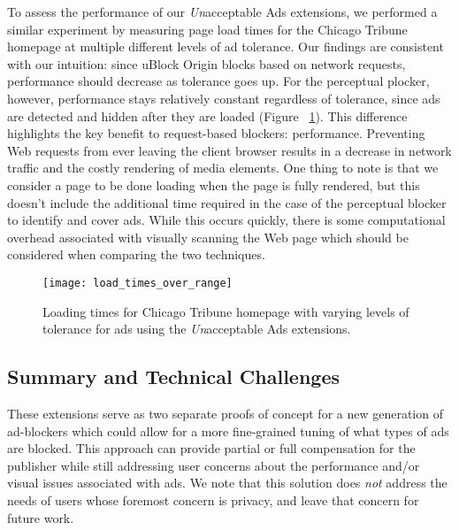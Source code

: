 To assess the performance of our \textit{Un}acceptable Ads extensions, we performed a similar experiment by measuring page load times for the Chicago Tribune homepage at multiple different levels of ad tolerance.
Our findings are consistent with our intuition: since uBlock Origin blocks based on network requests, performance should decrease as tolerance goes up.
For the perceptual plocker, however, performance stays relatively constant regardless of tolerance, since ads are detected and hidden after they are loaded (Figure ~\ref{fig:load_times_over_range}).
This difference highlights the key benefit to request-based blockers: performance.
Preventing Web requests from ever leaving the client browser results in a decrease in network traffic and the costly rendering of media elements.
One thing to note is that we consider a page to be done loading when the page is fully rendered, but this doesn't include the additional time required in the case of the perceptual blocker to identify and cover ads.
While this occurs quickly, there is some computational overhead associated with visually scanning the Web page which should be considered when comparing the two techniques.

\begin{figure}[t]
\centering
\texttt{[image: load\_times\_over\_range]}
\caption{Loading times for Chicago Tribune homepage with varying levels of tolerance for ads using the \textit{Un}acceptable Ads extensions.}
\label{fig:load_times_over_range}
\end{figure}

\subsection{Summary and Technical Challenges}
These extensions serve as two separate proofs of concept for a new generation of ad-blockers which could allow for a more fine-grained tuning of what types of ads are blocked.
This approach can provide partial or full compensation for the publisher while still addressing user concerns about the performance and/or visual issues associated with ads.
We note that this solution does \textit{not} address the needs of users whose foremost concern is privacy, and leave that concern for future work.


